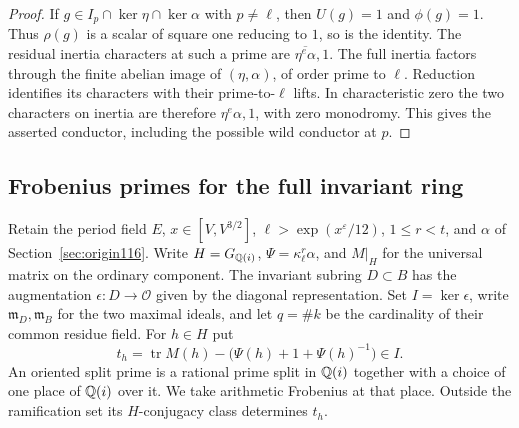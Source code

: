 \documentclass[a4paper,11pt]{article}
\theoremstyle{definition}
\theoremstyle{remark}
\numberwithin{equation}{section}
\newcommand{\OO}{\mathcal O}
\begin{document}
\begin{proof}
If \(g\in I_p\cap\ker\eta\cap\ker\alpha\) with \(p\ne\ell\),
then \(U(g)=1\) and \(\phi(g)=1\). Thus \(\rho(g)\) is a
scalar of square one reducing to \(1\), so is the identity.
The residual inertia characters at such a prime are
\(\overline{\eta^e\alpha},1\). The full inertia factors
through the finite abelian image of \((\eta,\alpha)\), of
order prime to \(\ell\). Reduction identifies its characters
with their prime-to-\(\ell\) lifts. In characteristic zero
the two characters on inertia are therefore \(\eta^e\alpha,1\),
with zero monodromy. This gives the asserted conductor,
including the possible wild conductor at \(p\).
\end{proof}

\subsection{Frobenius primes for the full invariant ring}\label{nav:IV-23}
\label{sec:frob124}

Retain the period field \(E\), \(x\in[V,V^{3/2}]\),
\(\ell>\exp(x^\varepsilon/12)\), \(1\le r<t\), and \(\alpha\)
of Section~\ref{sec:origin116}. Write \(H=G_{\mathbb Q(i)}\),
\(\Psi=\kappa_\ell^r\alpha\), and \(M|_H\) for the universal
matrix on the ordinary component. The invariant subring
\(D\subset B\) has the augmentation \(\epsilon:D\to\OO\)
given by the diagonal representation. Set \(I=\ker\epsilon\),
write \(\mathfrak m_D,\mathfrak m_B\) for the two maximal
ideals, and let \(q=\#k\) be the cardinality of their common
residue field. For \(h\in H\) put
\[
 t_h=\operatorname{tr}M(h)-\bigl(\Psi(h)+1+\Psi(h)^{-1}\bigr)
       \in I .
\]
An oriented split prime is a rational prime split in \(\mathbb Q(i)\)
together with a choice of one place of \(\mathbb Q(i)\) over it.
We take arithmetic Frobenius at that place. Outside the
ramification set its \(H\)-conjugacy class determines \(t_h\).
\end{document}
